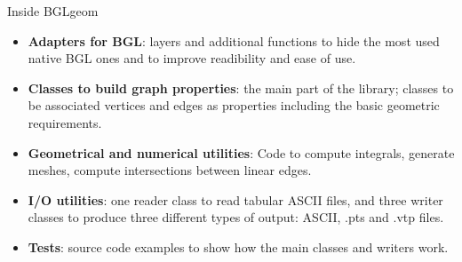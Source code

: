 \documentclass[11pt]{beamer}
\begin{document}
	\begin{frame}{Inside BGLgeom}
		\begin{itemize}
			\item \textbf{Adapters for BGL}: layers and additional functions to hide the most used native BGL ones and to improve readibility and ease of use.
			\item \textbf{Classes to build graph properties}: the main part of the library; classes to be associated vertices and edges
			as properties including the basic geometric requirements.
			\item \textbf{Geometrical and numerical utilities}: Code to compute integrals, generate meshes, compute intersections between linear edges.
			\item \textbf{I/O utilities}: one reader class to read tabular ASCII files, and three writer classes to produce three different types of output: ASCII, .pts and .vtp files.
			\item \textbf{Tests}: source code examples to show how the main classes and writers work.
		\end{itemize}
	\end{frame}
	
\end{document}
